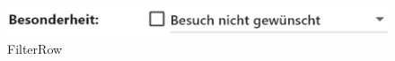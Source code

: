 \begin{figure}[H]
    \centering
    \includegraphics[width=0.5\linewidth]{images/AdminPanel/FilterRow.png}
    \caption{FilterRow}
\end{figure}

